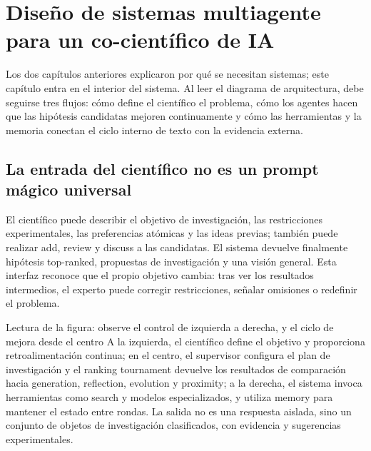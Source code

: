 \section{Diseño de sistemas multiagente para un co-científico de IA}

Los dos capítulos anteriores explicaron por qué se necesitan sistemas; este capítulo entra en el interior del sistema. Al leer el diagrama de arquitectura, debe seguirse tres flujos: cómo define el científico el problema, cómo los agentes hacen que las hipótesis candidatas mejoren continuamente y cómo las herramientas y la memoria conectan el ciclo interno de texto con la evidencia externa.

\subsection{La entrada del científico no es un prompt mágico universal}

El científico puede describir el objetivo de investigación, las restricciones experimentales, las preferencias atómicas y las ideas previas; también puede realizar add, review y discuss a las candidatas. El sistema devuelve finalmente hipótesis top-ranked, propuestas de investigación y una visión general. Esta interfaz reconoce que el propio objetivo cambia: tras ver los resultados intermedios, el experto puede corregir restricciones, señalar omisiones o redefinir el problema.


\begin{knowledgebox}{Lectura de la figura: observe el control de izquierda a derecha, y el ciclo de mejora desde el centro}
A la izquierda, el científico define el objetivo y proporciona retroalimentación continua; en el centro, el supervisor configura el plan de investigación y el ranking tournament devuelve los resultados de comparación hacia generation, reflection, evolution y proximity; a la derecha, el sistema invoca herramientas como search y modelos especializados, y utiliza memory para mantener el estado entre rondas. La salida no es una respuesta aislada, sino un conjunto de objetos de investigación clasificados, con evidencia y sugerencias experimentales.
\end{knowledgebox}



